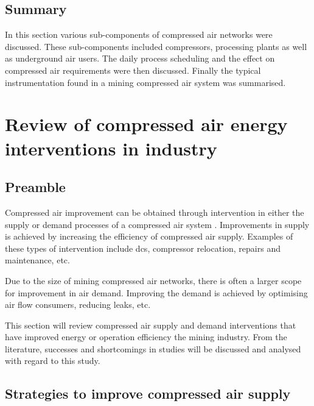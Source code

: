 \subsection{Summary}
In this section various sub-components of compressed air networks were discussed. These sub-components included compressors, processing plants as well as underground air users. The daily  process scheduling and the effect on compressed air requirements were then discussed. Finally the typical instrumentation found in a mining compressed air system was summarised.
\section{Review of compressed air energy interventions in industry}
	\subsection{Preamble}
		Compressed air improvement can be obtained through intervention in either the supply or demand processes of a compressed air system \cite{Kriel2014Masters}. Improvements in supply is achieved by increasing the efficiency of compressed air supply. Examples of these types of intervention include \gls{dcs}, compressor relocation, repairs and maintenance, etc. 
		\par
		Due to the size of mining compressed air networks, there is often a larger scope for improvement in air demand. Improving the demand is achieved by optimising air flow consumers, reducing leaks, etc.
		\par
	 	 This section will review compressed air supply and demand interventions that have improved energy or operation efficiency the mining industry. From the literature, successes and shortcomings in studies will be discussed and analysed with regard to this study.
	 	
	\subsection{Strategies to improve compressed air supply}

